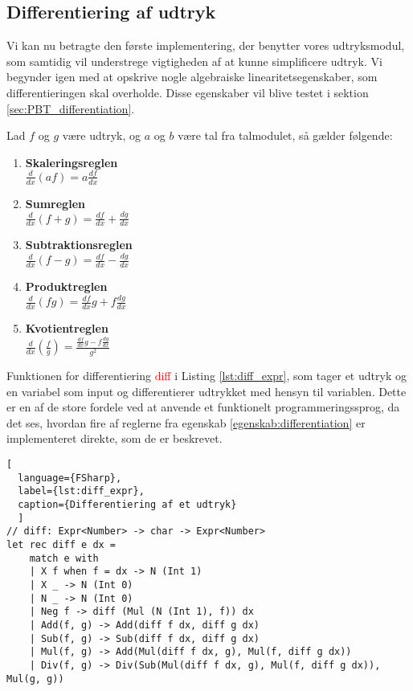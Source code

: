 \subsection{Differentiering af udtryk}
Vi kan nu betragte den første implementering, der benytter vores udtryksmodul, som samtidig vil understrege vigtigheden af at kunne simplificere udtryk. Vi begynder igen med at opskrive nogle algebraiske linearitetsegenskaber, som differentieringen skal overholde. Disse egenskaber vil blive testet i sektion \ref{sec:PBT_differentiation}.
\vspace{0.5cm}
\begin{egenskab}\label{egenskab:differentiation}
  Lad $f$ og $g$ være udtryk, og $a$ og $b$ være tal fra talmodulet, så gælder følgende:
  \begin{enumerate}
    \item \textbf{Skaleringsreglen} \\
    \(\frac{d}{dx}(af) = a\frac{df}{dx}\)
    \item \textbf{Sumreglen} \\
    \(\frac{d}{dx}(f+g) = \frac{df}{dx} + \frac{dg}{dx}\)
    \item \textbf{Subtraktionsreglen} \\
    \(\frac{d}{dx}(f-g) = \frac{df}{dx} - \frac{dg}{dx}\)
    \item \textbf{Produktreglen} \\
    \(\frac{d}{dx}(fg) = \frac{df}{dx}g + f\frac{dg}{dx}\)
    \item \textbf{Kvotientreglen} \\
    \(\frac{d}{dx}\left(\frac{f}{g}\right) = \frac{\frac{df}{dx}g - f\frac{dg}{dx}}{g^2}\)
  \end{enumerate}
\end{egenskab}

Funktionen for differentiering \textcolor{red}{diff} i Listing \ref{lst:diff_expr}, som tager et udtryk og en variabel som input og differentierer udtrykket med hensyn til variablen. Dette er en af de store fordele ved at anvende et funktionelt programmeringssprog, da det ses, hvordan fire af reglerne fra egenskab \ref{egenskab:differentiation} er implementeret direkte, som de er beskrevet.

\begin{lstlisting}[
  language={FSharp}, 
  label={lst:diff_expr}, 
  caption={Differentiering af et udtryk}
  ]
// diff: Expr<Number> -> char -> Expr<Number>
let rec diff e dx = 
    match e with
    | X f when f = dx -> N (Int 1)
    | X _ -> N (Int 0)
    | N _ -> N (Int 0)
    | Neg f -> diff (Mul (N (Int 1), f)) dx
    | Add(f, g) -> Add(diff f dx, diff g dx)
    | Sub(f, g) -> Sub(diff f dx, diff g dx)
    | Mul(f, g) -> Add(Mul(diff f dx, g), Mul(f, diff g dx))
    | Div(f, g) -> Div(Sub(Mul(diff f dx, g), Mul(f, diff g dx)), Mul(g, g))
\end{lstlisting}


